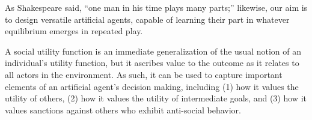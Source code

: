 As Shakespeare said, ``one man in his time plays many parts;''
likewise, our aim is to design versatile artificial agents, capable of learning
their part in whatever equilibrium emerges in repeated play.

A social utility function is an immediate generalization of the usual
notion of an individual's utility function, but it ascribes value to
the outcome as it relates to all actors in the environment.
%
%
As such, it can be used to capture important elements of an artificial
agent's decision making, including (1) how it values the utility of
others, (2) how it values the utility of intermediate goals, and (3)
how it values sanctions against others who exhibit anti-social behavior.
